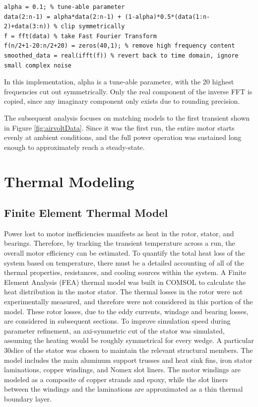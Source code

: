 \documentclass[]{aiaa-tc}%
\begin{document}
\begin{verbatim}
alpha = 0.1; % tune-able parameter 
data(2:n-1) = alpha*data(2:n-1) + (1-alpha)*0.5*(data(1:n-2)+data(3:n)) % clip symmetrically
f = fft(data) % take Fast Fourier Transform
f(n/2+1-20:n/2+20) = zeros(40,1); % remove high frequency content
smoothed_data = real(ifft(f)) % revert back to time domain, ignore small complex noise
\end{verbatim}

In this implementation, alpha is a tune-able parameter, with the 20 highest frequencies cut out symmetrically. Only the real component of the inverse FFT is copied, since any imaginary component only exists due to rounding precision.

The subsequent analysis focuses on matching models to the first transient shown in Figure \ref{fig:airvoltData}. Since it was the first run, the entire motor starts evenly at ambient conditions, and the full power operation was sustained long enough to approximately reach a steady-state.

\section{Thermal Modeling}

\subsection{Finite Element Thermal Model}

Power lost to motor inefficiencies manifests as heat in the rotor, stator, and bearings. Therefore, by tracking the transient temperature across a run, the overall motor efficiency can be estimated. To quantify the total heat loss of the system based on temperature, there must be a detailed accounting of all of the thermal properties, resistances, and cooling sources within the system. A Finite Element Analysis (FEA) thermal model was built in COMSOL to calculate the heat distribution in the motor stator. The thermal losses in the rotor were not experimentally measured, and therefore were not considered in this portion of the model. These rotor losses, due to the eddy currents, windage and bearing losses, are considered in subsequent sections. To improve simulation speed during parameter refinement, an axi-symmetric cut of the stator was simulated, assuming the heating would be roughly symmetrical for every wedge. A particular 30\degree  slice of the stator was chosen to maintain the relevant structural members. The model includes the main aluminum support trusses and heat sink fins, iron stator laminations, copper windings, and Nomex slot liners. The motor windings are modeled as a composite of copper strands and epoxy, while the slot liners between the windings and the laminations are approximated as a thin thermal boundary layer.
\end{document}
